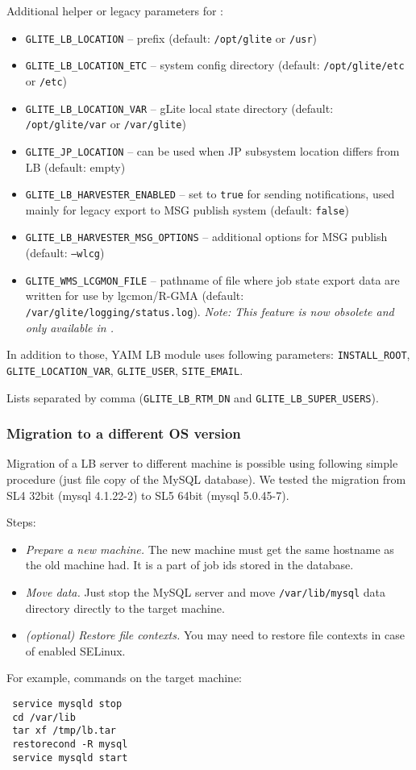Additional helper or legacy parameters for \LB:
\begin{itemize}
\item \texttt{GLITE\_LB\_LOCATION} -- \LB prefix (default: \texttt{/opt/glite} or \texttt{/usr})
\item \texttt{GLITE\_LB\_LOCATION\_ETC} -- system config directory (default: \texttt{/opt/glite/etc} or \texttt{/etc})
\item \texttt{GLITE\_LB\_LOCATION\_VAR} -- gLite local state directory (default: \texttt{/opt/glite/var} or \texttt{/var/glite})
\item \texttt{GLITE\_JP\_LOCATION} -- can be used when JP subsystem location differs from LB (default: empty)
\item \texttt{GLITE\_LB\_HARVESTER\_ENABLED} -- set to \texttt{true} for sending notifications, used mainly for legacy export to MSG publish system (default: \texttt{false})
\item \texttt{GLITE\_LB\_HARVESTER\_MSG\_OPTIONS} -- additional options for MSG publish (default: \texttt{--wlcg})
\item \texttt{GLITE\_WMS\_LCGMON\_FILE} -- pathname of file where job state
export data are written for use by lgcmon/R-GMA 
(default: \texttt{/var/glite/logging/status.log}). \emph{Note: This feature is now obsolete and only available in .}
\end{itemize}

In addition to those, YAIM LB module uses following parameters:
\texttt{INSTALL\_ROOT}, \texttt{GLITE\_LOCATION\_VAR}, \texttt{GLITE\_USER}, \texttt{SITE\_EMAIL}.

Lists separated by comma (\texttt{GLITE\_LB\_RTM\_DN} and \texttt{GLITE\_LB\_SUPER\_USERS}).

\subsubsection{Migration to a different OS version}
\label{inst:OSmigration}
Migration of a LB server to different machine is possible using
following simple procedure (just file copy of the MySQL database). We
tested the migration from SL4 32bit (mysql 4.1.22-2) to SL5 64bit
(mysql 5.0.45-7).

Steps:
\begin{itemize}
\item \emph{Prepare a new machine.} The new machine must get the same hostname 
 as the old machine had. It is a part of job ids stored in the database.
\item \emph{Move data.} Just stop the MySQL server and move
 \verb'/var/lib/mysql' data directory directly to the target machine.
\item \emph{(optional) Restore file contexts.} You may need to restore file 
 contexts in case of enabled SELinux.
\end{itemize}
For example, commands on the target machine:
 \begin{verbatim}
 service mysqld stop
 cd /var/lib
 tar xf /tmp/lb.tar
 restorecond -R mysql
 service mysqld start
 \end{verbatim}

